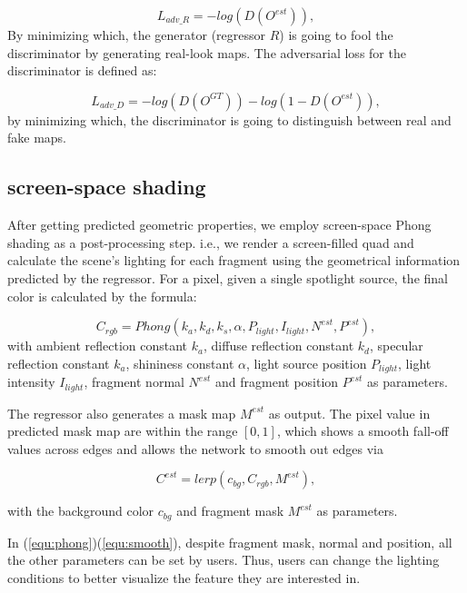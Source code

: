 \documentclass[journal]{vgtc}                %
\begin{document}
\begin{equation}
L_{adv\_R} = -log(D(O^{est})), 
\end{equation}
By minimizing which, the generator (regressor $R$) is going to fool the discriminator by generating real-look maps. The adversarial loss for the discriminator is defined as:

\begin{equation}
L_{adv\_D} = -log(D(O^{GT}))-log(1-D(O^{est})), 
\end{equation}
by minimizing which, the discriminator is going to distinguish between real and fake maps. 

\subsection{screen-space shading}
\label{subsection:shading}
After getting predicted geometric properties, we employ screen-space Phong shading as a post-processing step. i.e., we render a screen-filled quad and calculate the scene's lighting for each fragment using the geometrical information predicted by the regressor. For a pixel, given a single spotlight source, the final color is calculated by the formula:

\begin{equation}
C_{rgb} = Phong(k_a, k_d, k_s, \alpha, P_{light},  I_{light}, N^{est}, P^{est}), \label{equ:phong}
\end{equation}
with ambient reflection constant $k_a$, diffuse reflection constant $k_d$, specular reflection constant $k_a$,  shininess constant $\alpha$, light source position $P_{light}$, light intensity $I_{light}$, fragment normal $N^{est}$ and fragment position $P^{est}$ as parameters.

The regressor also generates a mask map $M^{est}$ as output. The pixel value in predicted mask map are within the range $[0, 1]$, which shows a smooth fall-off values across edges and allows the network to smooth out edges via

\begin{equation}
C^{est} = lerp(c_{bg}, C_{rgb}, M^{est}), \label{equ:smooth}
\end{equation}

with the background color $c_{bg}$ and fragment mask $M^{est}$ as parameters. 

In (\ref{equ:phong})(\ref{equ:smooth}), despite fragment mask, normal and position, all the other parameters can be set by users. Thus, users can change the lighting conditions to better visualize the feature they are interested in.
\end{document}
